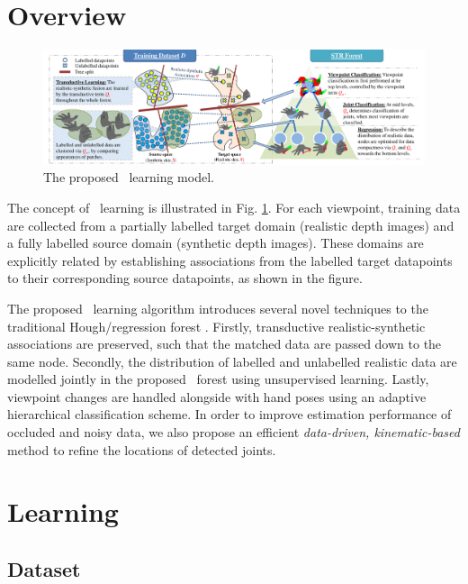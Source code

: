 \section{Overview}

\begin{figure}[ht]
	\includegraphics[width=1.00\linewidth]{fig/hand/fig2.pdf}
	\caption{The proposed \STR\ learning model.}
	\label{fig/hand/concept}
\end{figure}

The concept of \STR\ learning is illustrated in Fig. \ref{fig/hand/concept}. 
For each viewpoint, training data are collected from a partially labelled target domain (realistic depth images) and a fully labelled source domain (synthetic depth images). These domains are explicitly related by establishing associations from the labelled target datapoints to their corresponding source datapoints, as shown in the figure. 

The proposed \STR\ learning algorithm introduces several novel techniques to the traditional Hough/regression forest \cite{Gall2011}. 
Firstly, transductive realistic-synthetic associations are preserved, such that the matched data are passed down to the same node.
Secondly, the distribution of labelled and unlabelled realistic data are modelled jointly in the proposed \STR\ forest using unsupervised learning. 
Lastly, viewpoint changes are handled alongside with hand poses using an adaptive hierarchical classification scheme.
In order to improve estimation performance of occluded and noisy data, we also propose an efficient \emph{data-driven, kinematic-based} method to refine the locations of detected joints.

\section{Learning} 

\subsection{Dataset}

